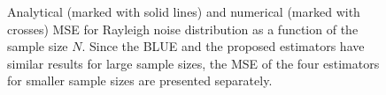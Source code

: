 \documentclass{article}
\begin{document}
\begin{figure}[ht]
\begin{minipage}[t]{1\linewidth}
{	\label{fig:rayleigh_blue_order_all}}
\hfil
{}
\caption{Analytical (marked with solid lines) and numerical (marked with crosses) MSE for Rayleigh noise distribution as a function of the sample size $N$.  Since the BLUE and the proposed estimators have similar results for large sample sizes, the MSE of the four estimators for smaller sample sizes are presented separately.}
\label{fig:rayleigh_blue_order}
	\end{minipage} 
\end{figure}
%
%
%
%
%
%
\end{document}
